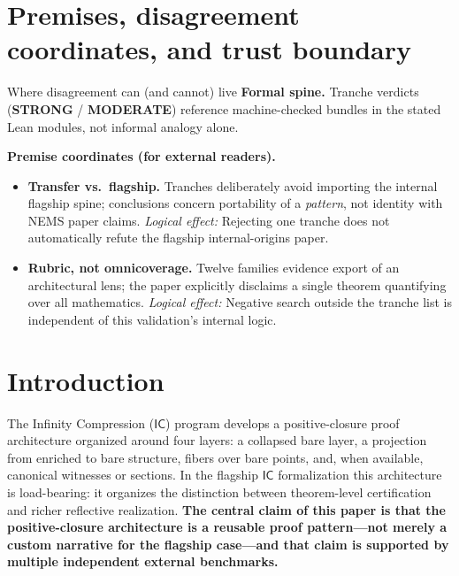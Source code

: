 \documentclass[11pt]{article}
\newcommand{\IC}{\ensuremath{\mathsf{IC}}}
\begin{document}
\section{Premises, disagreement coordinates, and trust boundary}\label{sec:premises-ic-external-validation}
\begin{keybox}{Where disagreement can (and cannot) live}
\textbf{Formal spine.}
Tranche verdicts (\textbf{STRONG} / \textbf{MODERATE}) reference machine-checked bundles in the stated Lean modules, not informal analogy alone.

\medskip
\textbf{Premise coordinates (for external readers).}
{\raggedright
\begin{itemize}[leftmargin=2em]
\item \textbf{Transfer vs.\ flagship.} Tranches deliberately avoid importing the internal flagship spine; conclusions concern portability of a \emph{pattern}, not identity with NEMS paper claims.
  \emph{Logical effect:} Rejecting one tranche does not automatically refute the flagship internal-origins paper.
\item \textbf{Rubric, not omnicoverage.} Twelve families evidence export of an architectural lens; the paper explicitly disclaims a single theorem quantifying over all mathematics.
  \emph{Logical effect:} Negative search outside the tranche list is independent of this validation's internal logic.
\end{itemize}
\par}
\end{keybox}

\tableofcontents
\newpage

\section{Introduction}\label{sec:intro}

The Infinity Compression (\IC{}) program develops a positive-closure proof architecture
organized around four layers: a collapsed bare layer, a projection from enriched to bare
structure, fibers over bare points, and, when available, canonical witnesses or sections.
In the flagship \IC{} formalization this architecture is load-bearing: it organizes the
distinction between theorem-level certification and richer reflective realization.
\textbf{The central claim of this paper is that the positive-closure architecture is a
reusable proof pattern---not merely a custom narrative for the flagship case---and that
claim is supported by multiple independent external benchmarks.}
\end{document}
